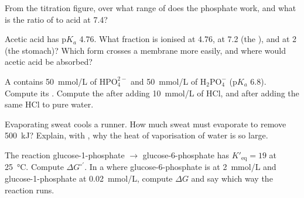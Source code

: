 \begin{exercise}[$\star$]\label{exo:b1:water-small-molecules:4}
From the titration figure, over what range of  does the phosphate
 work, and what is the ratio of  to acid at  7.4?
\end{exercise}

\begin{exercise}[$\star\star$]\label{exo:b1:water-small-molecules:5}
Acetic acid has p$K_a$ 4.76. What fraction is ionised at  4.76, at
 7.2 (the ), and at  2 (the stomach)? Which form crosses a
membrane more easily, and where would acetic acid be absorbed?
\end{exercise}

\begin{exercise}[$\star\star$]\label{exo:b1:water-small-molecules:6}
A  contains \qty{50}{mmol/L} of $\mathrm{HPO_4^{2-}}$ and
\qty{50}{mmol/L} of $\mathrm{H_2PO_4^-}$ (p$K_a$ 6.8). Compute its .
Compute the  after adding \qty{10}{mmol/L} of HCl, and after adding
the same HCl to pure water.
\end{exercise}

\begin{exercise}[$\star\star$]\label{exo:b1:water-small-molecules:7}
Evaporating sweat cools a runner. How much sweat must evaporate to
remove \qty{500}{kJ}? Explain, with , why the heat of
vaporisation of water is so large.
\end{exercise}

\begin{exercise}[$\star\star$]\label{exo:b1:water-small-molecules:8}
The reaction glucose-1-phosphate $\to$ glucose-6-phosphate has
$K'_{\text{eq}} = 19$ at \qty{25}{\celsius}. Compute
$\Delta G^{\circ\prime}$. In a  where glucose-6-phosphate is at
\qty{2}{mmol/L} and glucose-1-phosphate at \qty{0.02}{mmol/L}, compute
$\Delta G$ and say which way the reaction runs.
\end{exercise}

